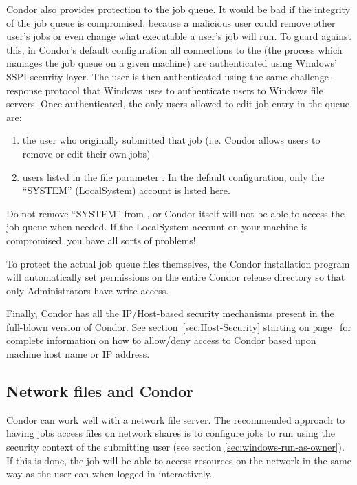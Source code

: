 Condor also provides protection to the job queue.  It would be bad if the
integrity of the job queue is compromised, because a malicious user could
remove other user's jobs or even change what executable a user's job will
run.  To guard against this, in Condor's default configuration all connections to the  (the
process which manages the job queue on a given machine) are authenticated
using Windows' SSPI security layer.  The user is then authenticated
using the same challenge-response protocol that Windows uses to authenticate
users to Windows file servers.  Once authenticated, the only users
allowed to edit job entry in the queue are:
\begin{enumerate}
\item the user who originally submitted that job (i.e. Condor allows users
to remove or edit their own jobs)
\item users listed in the  file parameter
.  In the default configuration, only the
``SYSTEM'' (LocalSystem) account is listed here.  
\end{enumerate}
\Warn Do not remove ``SYSTEM'' from , or
Condor itself will not be able to access the job queue when needed.  If the
LocalSystem account on your machine is compromised, you have all sorts of
problems!

To protect the actual job queue files themselves, the Condor installation
program will automatically set permissions on the entire Condor release
directory so that only Administrators have write access.

Finally, Condor has all the IP/Host-based security mechanisms present
in the full-blown version of Condor.  See section~\ref{sec:Host-Security}
starting on page~\pageref{sec:Host-Security} for complete information
on how to allow/deny access to Condor based upon machine host name or
IP address.


\subsection{\label{sec:network-files-solutions}Network files and Condor}

Condor can work well with a network file server.  The recommended
approach to having jobs access files on network shares is to configure
jobs to run using the security context of the submitting user (see
section \ref{sec:windows-run-as-owner}).  If this is done, the job
will be able to access resources on the network in the same way as the
user can when logged in interactively.

